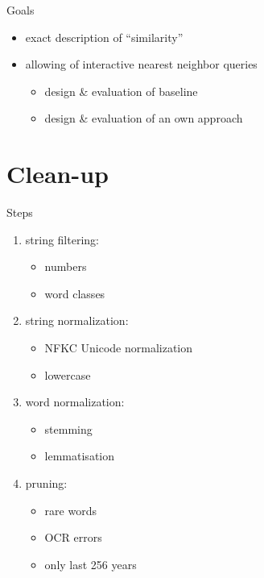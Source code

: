 \documentclass[14pt,t]{beamer}
\begin{document}
\begin{frame}{Goals}
    \begin{itemize}
        \item exact description of \enquote{similarity}
        \item allowing of interactive nearest neighbor queries
            \begin{itemize}
                \item design \& evaluation of baseline
                \item design \& evaluation of an own approach
            \end{itemize}
    \end{itemize}
\end{frame}

\section{Clean-up}
\begin{frame}{Steps}
    \begin{enumerate}
        \item string filtering:
            \begin{itemize}
                \item numbers
                \item word classes
            \end{itemize}
        \item string normalization:
            \begin{itemize}
                \item NFKC Unicode normalization
                \item lowercase
            \end{itemize}
        \item word normalization:
            \begin{itemize}
                \item stemming
                \item lemmatisation
            \end{itemize}
        \item pruning:
            \begin{itemize}
                \item rare words
                \item OCR errors
                \item only last \num{256} years
            \end{itemize}
    \end{enumerate}
\end{frame}
\end{document}
